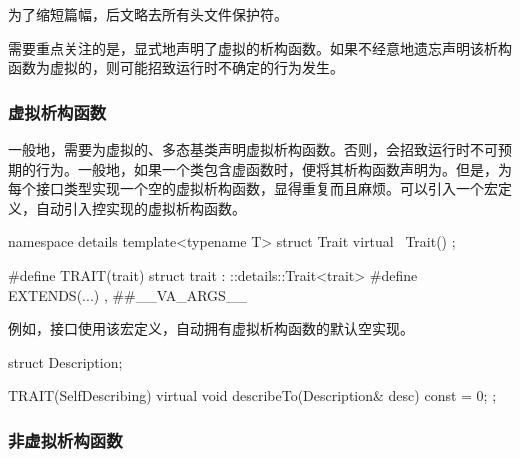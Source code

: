 \begin{content}
\begin{story}
\begin{content}
为了缩短篇幅，后文略去所有头文件保护符。

\end{content}

\end{story}

需要重点关注的是，显式地声明了虚拟的析构函数。如果不经意地遗忘声明该析构函数为虚拟的，则可能招致运行时不确定的行为发生。

\begin{story}
  \begin{center}
  \end{center}

\begin{content}

\subsubsection{虚拟析构函数}

一般地，需要为虚拟的、多态基类声明虚拟析构函数。否则，会招致运行时不可预期的行为。一般地，如果一个类包含虚函数时，便将其析构函数声明为。但是，为每个接口类型实现一个空的虚拟析构函数，显得重复而且麻烦。可以引入一个宏定义，自动引入控实现的虚拟析构函数。

\begin{leftbar}
 \begin{c++}[caption={\ttfamily{include/mars/core/Test.h}}]
namespace details {
  template<typename T>
  struct Trait {
    virtual ~Trait() {}
  };
}

#define TRAIT(trait)  struct trait : ::details::Trait<trait>
#define EXTENDS(...) , ##__VA_ARGS__
 \end{c++}
\end{leftbar}

例如，接口使用该宏定义，自动拥有虚拟析构函数的默认空实现。

\begin{leftbar}
 \begin{c++}
struct Description;

TRAIT(SelfDescribing) {
  virtual void describeTo(Description& desc) const = 0;
};
 \end{c++}
\end{leftbar}

\subsubsection{非虚拟析构函数}


\end{content}
\end{story}
\end{content}
